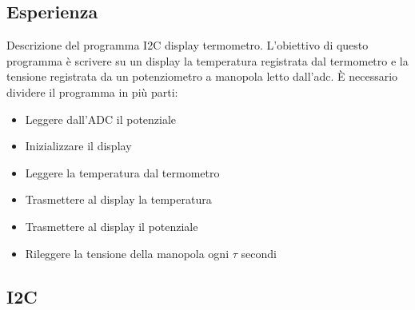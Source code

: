 \documentclass[main.tex]{subfiles}
\begin{document}
\subsection{Esperienza}

Descrizione del programma I2C display termometro. 
L'obiettivo di questo programma è scrivere su un display la temperatura registrata dal termometro e 
la tensione registrata da un potenziometro a manopola letto dall'adc.
È necessario dividere il programma in più parti:
\begin{itemize}
    \item Leggere dall'ADC il potenziale
    \item Inizializzare il display
    \item Leggere la temperatura dal termometro
    \item Trasmettere al display la temperatura
    \item Trasmettere al display il potenziale
    \item Rileggere la tensione della manopola ogni $\tau$ secondi
\end{itemize}

\subsection{I2C}
\end{document}
